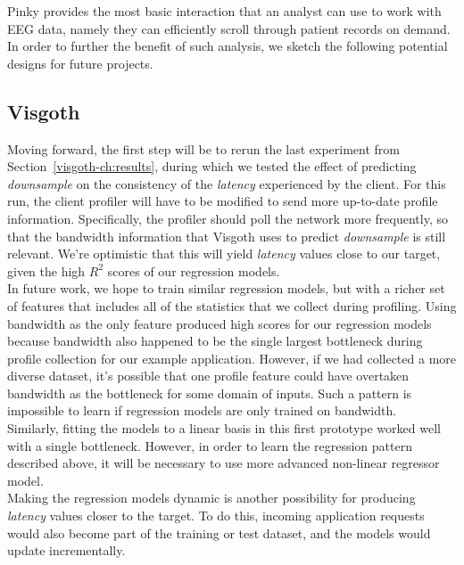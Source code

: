 Pinky provides the most basic interaction that an analyst can use to work with
EEG data, namely they can efficiently scroll through patient records on demand.
In order to further the benefit of such analysis, we sketch the following
potential designs for future projects.


\subsection{Visgoth}\label{discuss-ch:visgoth-future-work}

Moving forward, the first step will be to rerun the last experiment from
Section~\ref{visgoth-ch:results}, during which we tested the effect of predicting
\emph{downsample} on the consistency of the \emph{latency} experienced by the
client. For this run, the client profiler will have to be modified to send more
up-to-date profile information. Specifically, the profiler should poll the
network more frequently, so that the bandwidth information that Visgoth uses to
predict \emph{downsample} is still relevant. We're optimistic that this will
yield \emph{latency} values close to our target, given the high $R^2$ scores of
our regression models.\\

In future work, we hope to train similar regression models, but with a richer
set of features that includes all of the statistics that we collect during
profiling. Using bandwidth as the only feature produced high scores for our
regression models because bandwidth also happened to be the single largest
bottleneck during profile collection for our example application. However, if
we had collected a more diverse dataset, it's possible that one profile feature
could have overtaken bandwidth as the bottleneck for some domain of inputs.
Such a pattern is impossible to learn if regression models are only trained on
bandwidth.\\

Similarly, fitting the models to a linear basis in this first prototype worked
well with a single bottleneck. However, in order to learn the regression
pattern described above, it will be necessary to use more advanced non-linear
regressor model.\\

Making the regression models dynamic is another possibility for producing
\emph{latency} values closer to the target. To do this, incoming application
requests would also become part of the training or test dataset, and the models
would update incrementally.\\

